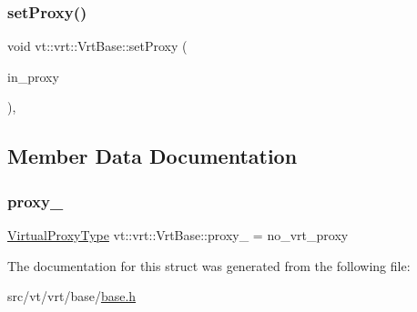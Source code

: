 \mbox{\label{structvt_1_1vrt_1_1_vrt_base_aa85b1aa3096a2adffe229927d76cebfd}} 
\subsubsection{\texorpdfstring{set\+Proxy()}{setProxy()}}
{\footnotesize\ttfamily void vt\+::vrt\+::\+Vrt\+Base\+::set\+Proxy (\begin{DoxyParamCaption}\item[{\hyperlink{namespacevt_a1b417dd5d684f045bb58a0ede70045ac}{Virtual\+Proxy\+Type} const \&}]{in\+\_\+proxy }\end{DoxyParamCaption})\hspace{0.3cm}{\ttfamily [inline]}, {\ttfamily [protected]}}



\subsection{Member Data Documentation}
\mbox{\label{structvt_1_1vrt_1_1_vrt_base_a1904e5218715dc8f4ec7c186ce4ffee3}} 
\subsubsection{\texorpdfstring{proxy\+\_\+}{proxy\_}}
{\footnotesize\ttfamily \hyperlink{namespacevt_a1b417dd5d684f045bb58a0ede70045ac}{Virtual\+Proxy\+Type} vt\+::vrt\+::\+Vrt\+Base\+::proxy\+\_\+ = no\+\_\+vrt\+\_\+proxy\hspace{0.3cm}{\ttfamily [private]}}



The documentation for this struct was generated from the following file\+:\begin{DoxyCompactItemize}
\item 
src/vt/vrt/base/\hyperlink{src_2vt_2vrt_2base_2base_8h}{base.\+h}\end{DoxyCompactItemize}
